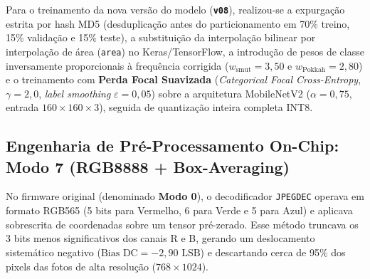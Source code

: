 \documentclass[12pt]{article}
\begin{document}
Para o treinamento da nova versão do modelo (\textbf{\texttt{v08}}), realizou-se a expurgação estrita por hash MD5 (desduplicação antes do particionamento em 70\% treino, 15\% validação e 15\% teste), a substituição da interpolação bilinear por interpolação de área (\texttt{area}) no Keras/TensorFlow, a introdução de pesos de classe inversamente proporcionais à frequência corrigida ($w_{\text{smut}} = 3,50$ e $w_{\text{Pokkah}} = 2,80$) e o treinamento com \textbf{Perda Focal Suavizada} (\textit{Categorical Focal Cross-Entropy}, $\gamma = 2,0$, \textit{label smoothing} $\varepsilon = 0,05$) \parencite{lin2017focal} sobre a arquitetura MobileNetV2 ($\alpha = 0,75$, entrada $160 \times 160 \times 3$), seguida de quantização inteira completa INT8.

\subsection{Engenharia de Pré-Processamento On-Chip: Modo 7 (RGB8888 + Box-Averaging)}

No firmware original (denominado \textbf{Modo 0}), o decodificador \texttt{JPEGDEC} operava em formato RGB565 (5 bits para Vermelho, 6 para Verde e 5 para Azul) e aplicava sobrescrita de coordenadas sobre um tensor pré-zerado. Esse método truncava os 3 bits menos significativos dos canais R e B, gerando um deslocamento sistemático negativo ($\text{Bias DC} = -2,90\text{ LSB}$) e descartando cerca de 95\% dos pixels das fotos de alta resolução ($768 \times 1024$).
\end{document}
